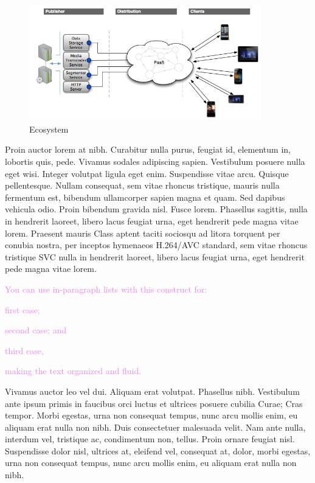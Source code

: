 \begin{figure}[h]
\centering
\includegraphics[width=0.9\textwidth]{./Images/cashed5}
\caption{Ecosystem}
\label{fig:cashed}
\end{figure}

Proin auctor lorem at nibh. Curabitur nulla purus, feugiat id, elementum in, lobortis quis, pede. Vivamus sodales adipiscing sapien. Vestibulum posuere nulla eget wisi. Integer volutpat ligula eget enim. Suspendisse vitae arcu. Quisque pellentesque. Nullam consequat, sem vitae rhoncus tristique, mauris nulla fermentum est, bibendum ullamcorper sapien magna et quam. Sed dapibus vehicula odio. Proin bibendum gravida nisl. Fusce lorem. Phasellus sagittis, nulla in hendrerit laoreet, libero lacus feugiat urna, eget hendrerit pede magna vitae lorem. Praesent mauris Class aptent taciti sociosqu ad litora torquent per conubia nostra, per inceptos hymenaeos H.264\slash \ac{AVC} standard, sem vitae rhoncus tristique \ac{SVC} \cite{Fraunhofer-Heinrich-Hertz-Institute:2013fk,ISO:H-264} nulla in hendrerit laoreet, libero lacus feugiat urna, eget hendrerit pede magna vitae lorem.

\textcolor{violet}{You can use in-paragraph lists with this construct for: 
\begin{inparaenum}[(a)]
\item first case;
\item second case; and
\item third case,
\end{inparaenum}
making the text organized and fluid.}

Vivamus auctor leo vel dui. Aliquam erat volutpat. Phasellus nibh. Vestibulum ante ipsum primis in faucibus orci luctus et ultrices posuere cubilia Curae; Cras tempor. Morbi egestas, urna non consequat tempus, nunc arcu mollis enim, eu aliquam erat nulla non nibh. Duis consectetuer malesuada velit. Nam ante nulla, interdum vel, tristique ac, condimentum non, tellus. Proin ornare feugiat nisl. Suspendisse dolor nisl, ultrices at, eleifend vel, consequat at, dolor, morbi egestas, urna non consequat tempus, nunc arcu mollis enim, eu aliquam erat nulla non nibh.



